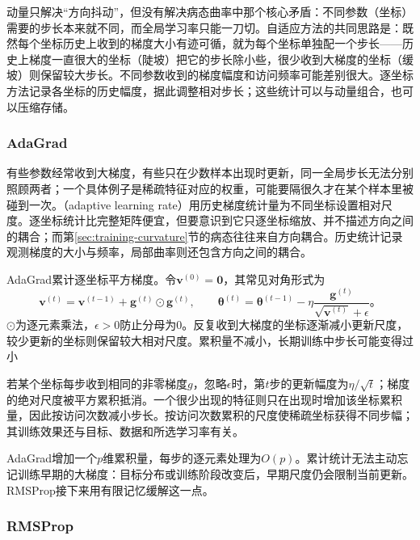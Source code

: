 动量只解决“方向抖动”，但没有解决病态曲率中那个核心矛盾：不同参数（坐标）需要的步长本来就不同，而全局学习率只能一刀切。自适应方法的共同思路是：既然每个坐标历史上收到的梯度大小有迹可循，就为每个坐标单独配一个步长——历史上梯度一直很大的坐标（陡坡）把它的步长除小些，很少收到大梯度的坐标（缓坡）则保留较大步长。不同参数收到的梯度幅度和访问频率可能差别很大。逐坐标方法记录各坐标的历史幅度，据此调整相对步长；这些统计可以与动量组合，也可以压缩存储。

\subsubsection{AdaGrad}
\label{sec:training-adaptive}

有些参数经常收到大梯度，有些只在少数样本出现时更新，同一全局步长无法分别照顾两者；一个具体例子是稀疏特征对应的权重，可能要隔很久才在某个样本里被碰到一次。（adaptive learning rate）用历史梯度统计量为不同坐标设置相对尺度。逐坐标统计比完整矩阵便宜，但要意识到它只逐坐标缩放、并不描述方向之间的耦合；而第\ref{sec:training-curvature}节的病态往往来自方向耦合。历史统计记录观测梯度的大小与频率，局部曲率则还包含方向之间的耦合。

AdaGrad累计逐坐标平方梯度。令$\bm v^{(0)}=\bm0$，其常见对角形式为
\begin{equation}
  \bm v^{(t)}=\bm v^{(t-1)}+\bm g^{(t)}\odot\bm g^{(t)},\qquad
  \bm\theta^{(t)}=\bm\theta^{(t-1)}-
  \eta\frac{\bm g^{(t)}}{\sqrt{\bm v^{(t)}}+\epsilon}\text{。}
  \label{eq:training-adagrad}
\end{equation}
$\odot$为逐元素乘法，$\epsilon>0$防止分母为0。反复收到大梯度的坐标逐渐减小更新尺度，较少更新的坐标则保留较大相对尺度。累积量不减小，长期训练中步长可能变得过小

若某个坐标每步收到相同的非零梯度$g$，忽略$\epsilon$时，第$t$步的更新幅度为$\eta/\sqrt t$；梯度的绝对尺度被平方累积抵消。一个很少出现的特征则只在出现时增加该坐标累积量，因此按访问次数减小步长。按访问次数累积的尺度使稀疏坐标获得不同步幅；其训练效果还与目标、数据和所选学习率有关。

AdaGrad增加一个$p$维累积量，每步的逐元素处理为$O(p)$。累计统计无法主动忘记训练早期的大梯度：目标分布或训练阶段改变后，早期尺度仍会限制当前更新。RMSProp接下来用有限记忆缓解这一点。

\subsubsection{RMSProp}
\label{sec:training-rmsprop}

